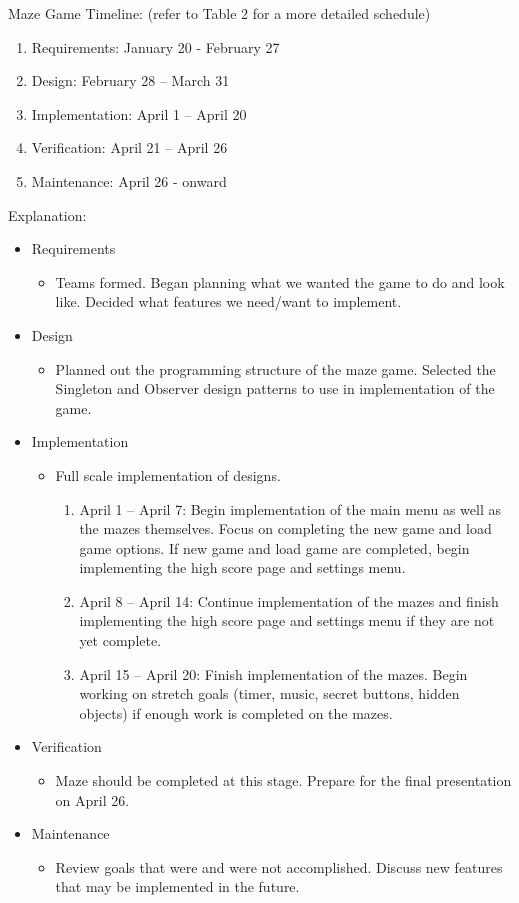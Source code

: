 \documentclass[10pt,conference,onecolumn,compsoc]{IEEEtran}
\begin{document}
Maze Game Timeline: (refer to Table 2 for a more detailed schedule)
\begin{enumerate}
\item Requirements: January 20 - February 27
\item Design: February 28 – March 31
\item Implementation: April 1 – April 20
\item Verification: April 21 – April 26
\item Maintenance: April 26 - onward
\end{enumerate}
Explanation: 
\begin{itemize} 
\item Requirements
\begin{itemize}
\item Teams formed. Began planning what we wanted the game to do and look like. Decided what features we need/want to implement.
\end{itemize}
\item Design
\begin{itemize}
\item Planned out the programming structure of the maze game. Selected the Singleton and Observer design patterns to use in implementation of the game.
\end{itemize}
\item Implementation
\begin{itemize}
\item Full scale implementation of designs.
\begin{enumerate}
\item April 1 – April 7: Begin implementation of the main menu as well as the mazes themselves. Focus on completing the new game and load game options. If new game and load game are completed, begin implementing the high score page and settings menu.
\item April 8 – April 14: Continue implementation of the mazes and finish implementing the high score page and settings menu if they are not yet complete.
\item April 15 – April 20: Finish implementation of the mazes. Begin working on stretch goals (timer, music, secret buttons, hidden objects) if enough work is completed on the mazes.
\end{enumerate}
\end{itemize}
\item Verification
\begin{itemize}
\item Maze should be completed at this stage. Prepare for the final presentation on April 26.
\end{itemize}
\item Maintenance
\begin{itemize}
\item Review goals that were and were not accomplished. Discuss new features that may be implemented in the future.
\end{itemize}
\end{itemize} 
\end{document}
